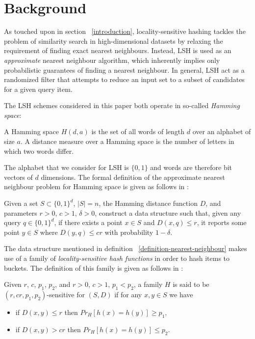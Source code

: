\section{Background}
\label{background}

As touched upon in section ~\ref{introduction}, locality-sensitive hashing tackles the problem of similarity search in high-dimensional datasets by relaxing the requirement of finding exact nearest neighbours. Instead, LSH is used as an \textit{approximate} nearest neighbour algorithm, which inherently implies only probabilistic guarantees of finding a nearest neighbour. In general, LSH act as a randomized filter that attempts to reduce an input set to a subset of candidates for a given query item.

The LSH schemes considered in this paper both operate in so-called \textit{Hamming space}:

\begin{definition}
\label{definition-hamming-space}
  A Hamming space $H(d, a)$ is the set of all words of length $d$ over an alphabet of size $a$. A distance measure over a Hamming space is the number of letters in which two words differ.
\end{definition}

The alphabet that we consider for LSH is $\{0, 1\}$ and words are therefore bit vectors of $d$ dimensions. The formal definition of the approximate nearest neighbour problem for Hamming space is given as follows in \cite{DBLP:journals/corr/PhamP16}:

\begin{definition}
\label{definition-nearest-neighbour}
  Given a set $S \subset \{0, 1\}^d$, $|S| = n$, the Hamming distance function $D$, and parameters $r > 0$, $c > 1$, $\delta > 0$, construct a data structure such that, given any query $q \in \{0,1\}^d$, if there exists a point $x \in S$ and $D(x, q) \leq r$, it reports some point $y \in S$ where $D(y, q) \leq cr$ with probability $1 - \delta$.
\end{definition}

The data structure mentioned in definition ~\ref{definition-nearest-neighbour} makes use of a family of \textit{locality-sensitive hash functions} in order to hash items to buckets. The definition of this family is given as follows in \cite{DBLP:conf/stoc/IndykM98}:

\begin{definition}
\label{definition-hash-functions}
  Given $r$, $c$, $p_1$, $p_2$, and $r > 0$, $c > 1$, $p_1 < p_2$, a family $H$ is said to be $(r, cr, p_1, p_2)$-sensitive for $(S, D)$ if for any $x, y \in S$ we have

  \begin{itemize}
    \item if $D(x, y) \leq r$ then $Pr_H [h(x) = h(y)] \geq p_1$,
    \item if $D(x, y) > cr$ then $Pr_H [h(x) = h(y)] \leq p_2$.
  \end{itemize}
\end{definition}

